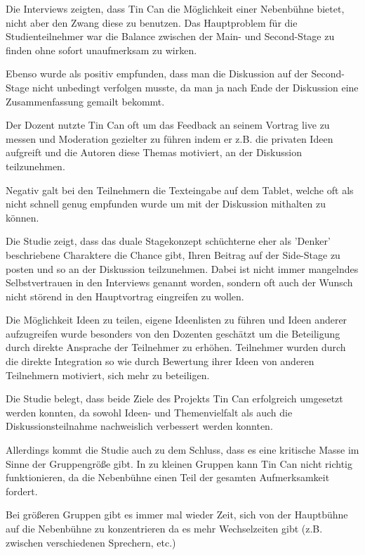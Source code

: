Die Interviews zeigten, dass Tin Can die Möglichkeit einer Nebenbühne bietet,
nicht aber den Zwang diese zu benutzen. Das Hauptproblem für die
Studienteilnehmer war die Balance zwischen der Main- und Second-Stage zu finden
ohne sofort unaufmerksam zu wirken.

Ebenso wurde als positiv empfunden, dass man die Diskussion auf der Second-Stage
nicht unbedingt verfolgen musste, da man ja nach Ende der Diskussion eine
Zusammenfassung gemailt bekommt.

Der Dozent nutzte Tin Can oft um das Feedback an seinem Vortrag live zu messen
und Moderation gezielter zu führen indem er z.B. die privaten Ideen aufgreift
und die Autoren diese Themas motiviert, an der Diskussion teilzunehmen.

Negativ galt bei den Teilnehmern die Texteingabe auf dem Tablet, welche oft als
nicht schnell genug empfunden wurde um mit der Diskussion mithalten zu können.

Die Studie zeigt, dass das duale Stagekonzept schüchterne eher als 'Denker'
beschriebene Charaktere die Chance gibt, Ihren Beitrag auf der Side-Stage zu
posten und so an der Diskussion teilzunehmen. Dabei ist nicht immer mangelndes
Selbstvertrauen in den Interviews genannt worden, sondern oft auch der Wunsch
nicht störend in den Hauptvortrag eingreifen zu wollen.

Die Möglichkeit Ideen zu teilen, eigene Ideenlisten zu führen und Ideen anderer
aufzugreifen wurde besonders von den Dozenten geschätzt um die Beteiligung durch
direkte Ansprache der Teilnehmer zu erhöhen. Teilnehmer wurden durch die direkte
Integration so wie durch Bewertung ihrer Ideen von anderen Teilnehmern
motiviert, sich mehr zu beteiligen.

Die Studie belegt, dass beide Ziele des Projekts Tin Can erfolgreich umgesetzt
werden konnten, da sowohl Ideen- und Themenvielfalt als auch die
Diskussionsteilnahme nachweislich verbessert werden konnten.

Allerdings kommt die Studie auch zu dem Schluss, dass es eine kritische Masse im
Sinne der Gruppengröße gibt. In zu kleinen Gruppen kann Tin Can nicht richtig
funktionieren, da die Nebenbühne einen Teil der gesamten Aufmerksamkeit fordert.

Bei größeren Gruppen gibt es immer mal wieder Zeit, sich von der Hauptbühne auf
die Nebenbühne zu konzentrieren da es mehr Wechselzeiten gibt (z.B. zwischen
verschiedenen Sprechern, etc.)





